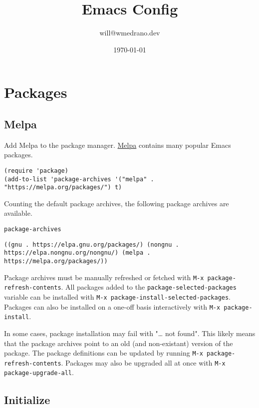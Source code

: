 \documentclass[11pt]{article}
\author{will@wmedrano.dev}
\date{\today}
\title{Emacs Config}
\begin{document}
\maketitle
\tableofcontents

\section{Packages}
\label{sec:org9bf85c0}

\subsection{Melpa}
\label{sec:org7915c61}

Add Melpa to the package manager. \href{https://melpa.org}{Melpa} contains many popular Emacs packages.

\begin{verbatim}
(require 'package)
(add-to-list 'package-archives '("melpa" . "https://melpa.org/packages/") t)
\end{verbatim}

Counting the default package archives, the following package archives are
available.

\begin{verbatim}
package-archives
\end{verbatim}

\label{orgf010245}
\begin{verbatim}
((gnu . https://elpa.gnu.org/packages/) (nongnu . https://elpa.nongnu.org/nongnu/) (melpa . https://melpa.org/packages/))
\end{verbatim}


Package archives must be manually refreshed or fetched with \texttt{M-x
package-refresh-contents}. All packages added to the \texttt{package-selected-packages}
variable can be installed with \texttt{M-x package-install-selected-packages}. Packages
can also be installed on a one-off basis interactively with \texttt{M-x
package-install}.

In some cases, package installation may fail with "\ldots{} not found". This likely
means that the package archives point to an old (and non-existant) version of
the package. The package definitions can be updated by running \texttt{M-x
package-refresh-contents}. Packages may also be upgraded all at once with \texttt{M-x
package-upgrade-all}.
\subsection{Initialize}
\label{sec:org7bc0fbc}
\end{document}
